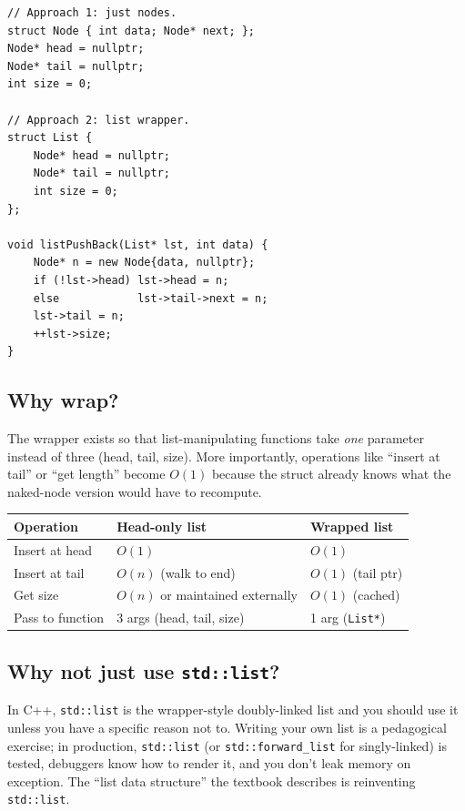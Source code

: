 \documentclass[11pt]{article}
\begin{document}
\begin{lstlisting}[basicstyle=\ttfamily\small,frame=single]
// Approach 1: just nodes.
struct Node { int data; Node* next; };
Node* head = nullptr;
Node* tail = nullptr;
int size = 0;

// Approach 2: list wrapper.
struct List {
    Node* head = nullptr;
    Node* tail = nullptr;
    int size = 0;
};

void listPushBack(List* lst, int data) {
    Node* n = new Node{data, nullptr};
    if (!lst->head) lst->head = n;
    else            lst->tail->next = n;
    lst->tail = n;
    ++lst->size;
}
\end{lstlisting}

\subsection*{Why wrap?}

\begin{ideabox}
The wrapper exists so that list-manipulating functions take \emph{one} parameter instead of three (head, tail, size). More importantly, operations like ``insert at tail'' or ``get length'' become $O(1)$ because the struct already knows what the naked-node version would have to recompute.
\end{ideabox}

\begin{center}
\begin{tabular}{lll}
\hline
Operation & Head-only list & Wrapped list \\
\hline
Insert at head & $O(1)$ & $O(1)$ \\
Insert at tail & $O(n)$ (walk to end) & $O(1)$ (tail ptr) \\
Get size & $O(n)$ or maintained externally & $O(1)$ (cached) \\
Pass to function & 3 args (head, tail, size) & 1 arg (\texttt{List*}) \\
\hline
\end{tabular}
\end{center}

\subsection*{Why not just use \texttt{std::list}?}

\begin{warnbox}
In C++, \texttt{std::list} is the wrapper-style doubly-linked list and you should use it unless you have a specific reason not to. Writing your own list is a pedagogical exercise; in production, \texttt{std::list} (or \texttt{std::forward\_list} for singly-linked) is tested, debuggers know how to render it, and you don't leak memory on exception. The ``list data structure'' the textbook describes is reinventing \texttt{std::list}.
\end{warnbox}
\end{document}
